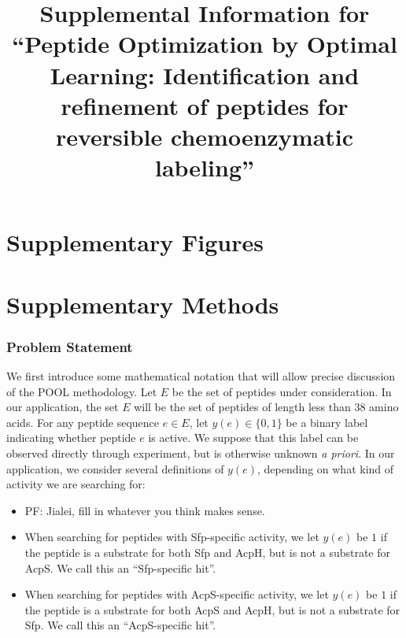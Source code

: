 \documentclass[11pt]{article}
\newcommand{\pfcomment}[1]{\color{blue} PF: #1}
\begin{document}
\title{Supplemental Information for \enquote{Peptide Optimization by Optimal Learning: 
Identification and refinement of peptides for reversible chemoenzymatic labeling}}
\maketitle
\tableofcontents
\newpage
\part{Supplementary Figures}
\part{Supplementary Methods}
\section{Problem Statement}



We first introduce some mathematical notation that will allow precise discussion of the POOL methodology. Let $E$ be the set of peptides under consideration.
In our application, the set $E$ will be the set of peptides of length less than 38 amino acids.
For any peptide sequence $e \in E$, let $y(e) \in \{0, 1\}$ be a binary label indicating whether
peptide $e$ is active.  We suppose that this label can be observed directly through experiment, but is otherwise unknown {\it a priori}.
In our application, we consider several definitions of $y(e)$, depending on what kind of activity we are searching for:
\begin{itemize}
\item \pfcomment{Jialei, fill in whatever you think makes sense}.
\item When searching for peptides with Sfp-specific activity, we let $y(e)$ be $1$ if the peptide is a substrate for both Sfp and AcpH, but is not a substrate for AcpS.  We call this an \enquote{Sfp-specific hit}.
\item When searching for peptides with AcpS-specific activity, we let $y(e)$ be $1$ if the peptide is a substrate for both AcpS and AcpH, but is not a substrate for Sfp.  We call this an \enquote{AcpS-specific hit}.
\end{itemize}
\end{document}
